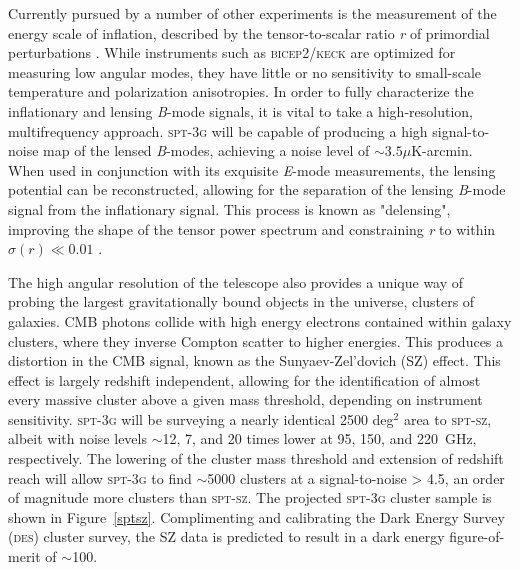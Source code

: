 \documentclass[iop]{emulateapj}
\begin{document}
Currently pursued by a number of other experiments is the measurement of the energy scale of inflation, described by the tensor-to-scalar ratio \textit{r} of primordial perturbations \citep{samtleben_cosmic_2007}.  While instruments such as \textsc{bicep2}/\textsc{keck} are optimized for measuring low angular modes, they have little or no sensitivity to small-scale temperature and polarization anisotropies.  In order to fully characterize the inflationary and lensing \textit{B}-mode signals, it is vital to take a high-resolution, multifrequency approach.  \textsc{spt-3g} will be capable of producing a high signal-to-noise map of the lensed \textit{B}-modes, achieving a noise level of $\sim3.5\mu$K-arcmin.  When used in conjunction with its exquisite \textit{E}-mode measurements, the lensing potential can be reconstructed, allowing for the separation of the lensing \textit{B}-mode signal from the inflationary signal.  This process is known as "delensing", improving the shape of the tensor power spectrum and constraining \textit{r} to within $\sigma(r)\ll0.01$ \citep{benson_spt-3g:_2014}.

The high angular resolution of the telescope also provides a unique way of probing the largest gravitationally bound objects in the universe, clusters of galaxies.  CMB photons collide with high energy electrons contained within galaxy clusters, where they inverse Compton scatter to higher energies.  This produces a distortion in the CMB signal, known as the Sunyaev-Zel'dovich (SZ) effect.  This effect is largely redshift independent, allowing for the identification of almost every massive cluster above a given mass threshold, depending on instrument sensitivity.  \textsc{spt-3g} will be surveying a nearly identical 2500 deg$^2$ area to \textsc{spt-sz}, albeit with noise levels $\sim$12, 7, and 20 times lower at 95, 150, and 220~GHz, respectively.  The lowering of the cluster mass threshold and extension of redshift reach will allow \textsc{spt-3g} to find $\sim$5000 clusters at a signal-to-noise > 4.5, an order of magnitude more clusters than \textsc{spt-sz}.  The projected \textsc{spt-3g} cluster sample is shown in Figure~\ref{sptsz}.  Complimenting and calibrating the Dark Energy Survey (\textsc{des}) cluster survey, the SZ data is predicted to result in a dark energy figure-of-merit of $\sim$100.
\end{document}
